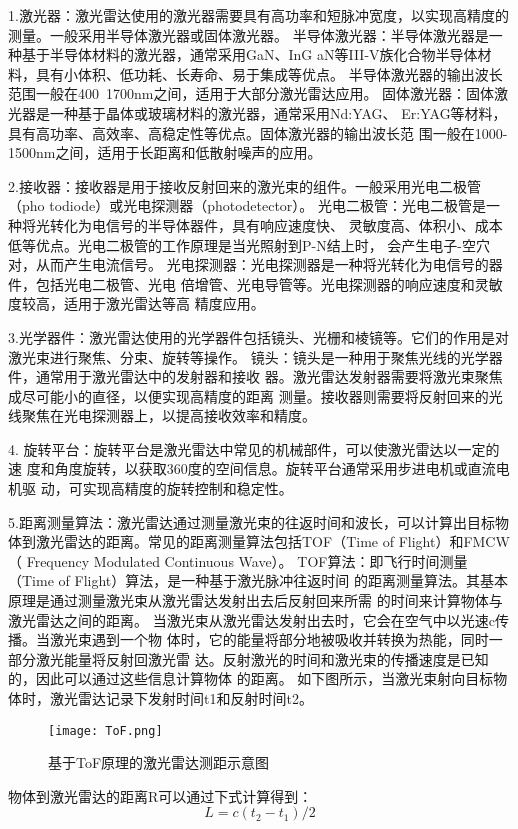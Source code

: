 1.激光器：激光雷达使用的激光器需要具有高功率和短脉冲宽度，以实现高精度的
测量。一般采用半导体激光器或固体激光器。
半导体激光器：半导体激光器是一种基于半导体材料的激光器，通常采用GaN、InG
aN等III-V族化合物半导体材料，具有小体积、低功耗、长寿命、易于集成等优点。
半导体激光器的输出波长范围一般在400~1700nm之间，适用于大部分激光雷达应用。
固体激光器：固体激光器是一种基于晶体或玻璃材料的激光器，通常采用Nd:YAG、
Er:YAG等材料，具有高功率、高效率、高稳定性等优点。固体激光器的输出波长范
围一般在1000-1500nm之间，适用于长距离和低散射噪声的应用。

2.接收器：接收器是用于接收反射回来的激光束的组件。一般采用光电二极管（pho
todiode）或光电探测器（photodetector）。
光电二极管：光电二极管是一种将光转化为电信号的半导体器件，具有响应速度快、
灵敏度高、体积小、成本低等优点。光电二极管的工作原理是当光照射到P-N结上时，
会产生电子-空穴对，从而产生电流信号。
光电探测器：光电探测器是一种将光转化为电信号的器件，包括光电二极管、光电
倍增管、光电导管等。光电探测器的响应速度和灵敏度较高，适用于激光雷达等高
精度应用。

3.光学器件：激光雷达使用的光学器件包括镜头、光栅和棱镜等。它们的作用是对激光束进行聚焦、分束、旋转等操作。
镜头：镜头是一种用于聚焦光线的光学器件，通常用于激光雷达中的发射器和接收
器。激光雷达发射器需要将激光束聚焦成尽可能小的直径，以便实现高精度的距离
测量。接收器则需要将反射回来的光线聚焦在光电探测器上，以提高接收效率和精度。

4. 旋转平台：旋转平台是激光雷达中常见的机械部件，可以使激光雷达以一定的速
度和角度旋转，以获取360度的空间信息。旋转平台通常采用步进电机或直流电机驱
动，可实现高精度的旋转控制和稳定性。

5.距离测量算法：激光雷达通过测量激光束的往返时间和波长，可以计算出目标物
体到激光雷达的距离。常见的距离测量算法包括TOF（Time of Flight）和FMCW（
Frequency Modulated Continuous Wave）。
TOF算法：即飞行时间测量（Time of Flight）算法，是一种基于激光脉冲往返时间
的距离测量算法。其基本原理是通过测量激光束从激光雷达发射出去后反射回来所需
的时间来计算物体与激光雷达之间的距离。
当激光束从激光雷达发射出去时，它会在空气中以光速c传播。当激光束遇到一个物
体时，它的能量将部分地被吸收并转换为热能，同时一部分激光能量将反射回激光雷
达。反射激光的时间和激光束的传播速度是已知的，因此可以通过这些信息计算物体
的距离。
如下图所示，当激光束射向目标物体时，激光雷达记录下发射时间t1和反射时间t2。
\begin{figure}[ht]
    \centering
    \texttt{[image: ToF.png]}
    \caption{基于ToF原理的激光雷达测距示意图}
\end{figure}
物体到激光雷达的距离R可以通过下式计算得到：
\begin{equation}
    L = c(t_2 - t_1) / 2
\end{equation}

